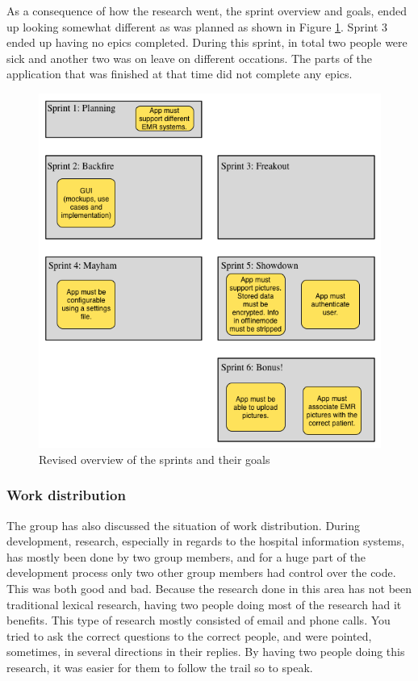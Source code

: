 As a consequence of how the research went, the sprint overview and goals, ended up looking somewhat different as was planned as shown in Figure \ref{fig:sprinter_oversikt_rev}. Sprint 3 ended up having no epics completed. During this sprint, in total two people were sick and another two was on leave on different occations. The parts of the application that was finished at that time did not complete any epics.

\begin{figure}[H]
\centering
\includegraphics[scale=0.7]{img/sprint_overview_rev.png}
\caption{Revised overview of the sprints and their goals}
\label{fig:sprinter_oversikt_rev}
\end{figure}


\subsubsection{Work distribution}
The group has also discussed the situation of work distribution. During development, research, especially in regards to the hospital information systems, has mostly been done by two group members, and for a huge part of the development process only two other group members had control over the code. This was both good and bad. Because the research done in this area has not been traditional lexical research, having two people doing most of the research had it benefits. This type of research mostly consisted of email and phone calls. You tried to ask the correct questions to the correct people, and were pointed, sometimes, in several directions in their replies. By having two people doing this research, it was easier for them to follow the trail so to speak.

